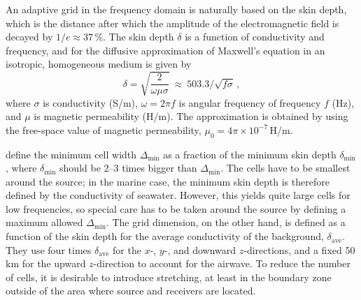 \documentclass[
    manuscript,
  ]{geophysics}
\begin{document}
An adaptive grid in the frequency domain is naturally based on the skin depth,
which is the distance after which the amplitude of the electromagnetic field is
decayed by $1/e\approx 37\,\%$. The skin depth $\delta$ is a function of
conductivity and frequency, and for the diffusive approximation of Maxwell's
equation in an isotropic, homogeneous medium is given by \citep[e.g.,][
equation~1.53]{B.SEG.88.Ward}
%
\begin{equation}
  \delta = \sqrt{\frac{2}{\omega\mu\sigma}}
  \ \approx \
  503.3/\sqrt{f\sigma} \, ,
  \label{eq:skindepth}
\end{equation}
%
where $\sigma$ is conductivity (S/m), $\omega=2\pi f$ is angular frequency of
frequency $f$ (Hz), and $\mu$ is magnetic permeability (H/m). The approximation
is obtained by using the free-space value of magnetic permeability,
$\mu_0=4\pi\times10^{-7}\,$H/m.

\cite{GEO.07.Plessix} define the minimum cell width $\Delta_\mathrm{min}$ as a
fraction of the minimum skin depth $\delta_\mathrm{min}$, where
$\delta_\mathrm{min}$ should be 2--3 times bigger than $\Delta_\mathrm{min}$.
The cells have to be smallest around the source; in the marine case, the
minimum skin depth is therefore defined by the conductivity of seawater.
However, this yields quite large cells for low frequencies, so special care has
to be taken around the source by defining a maximum allowed
$\Delta_\mathrm{min}$. The grid dimension, on the other hand, is defined as a
function of the skin depth for the average conductivity of the background,
$\delta_\mathrm{ave}$. They use four times $\delta_\mathrm{ave}$ for the $x$-,
$y$-, and downward $z$-directions, and a fixed 50\,km for the upward
$z$-direction to account for the airwave. To reduce the number of cells, it is
desirable to introduce stretching, at least in the boundary zone outside of the
area where source and receivers are located.
\end{document}
